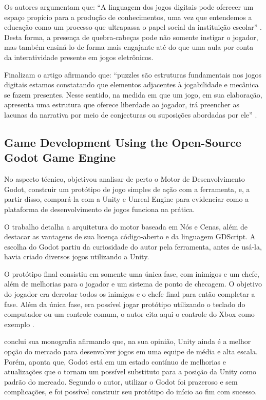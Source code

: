 Os autores argumentam que: ``A linguagem dos jogos digitais pode oferecer um espaço propício para a produção de conhecimentos, uma vez que entendemos a educação como um processo que ultrapassa o papel social da instituição escolar'' \cite[p. 105]{Toneis2015}. Desta forma, a presença de quebra-cabeças pode não somente instigar o jogador, mas também ensiná-lo de forma mais engajante até do que uma aula por conta da interatividade presente em jogos eletrônicos.

Finalizam o artigo afirmando que: ``puzzles são estruturas fundamentais nos jogos digitais estamos constatando que elementos adjacentes à jogabilidade e mecânica se fazem presentes. Nesse sentido, na medida em que um jogo, em sua elaboração, apresenta uma estrutura que oferece liberdade ao jogador, irá preencher as lacunas da narrativa por meio de conjecturas ou suposições abordadas por ele'' \cite[p. 111]{Toneis2015}.

\subsection{Game Development Using the Open-Source Godot Game Engine}

No aspecto técnico,  objetivou analisar de perto o Motor de Desenvolvimento Godot, construir um protótipo de jogo simples de ação com a ferramenta, e, a partir disso, compará-la com a Unity e Unreal Engine para evidenciar como a plataforma de desenvolvimento de jogos funciona na prática. 

O trabalho detalha a arquitetura do motor baseada em Nós e Cenas, além de destacar as vantagens de sua licença código-aberto e da linguagem GDScript. A escolha do Godot partiu da curiosidade do autor pela ferramenta, antes de usá-la,  havia criado diversos jogos utilizando a Unity.

O protótipo final consistiu em somente uma única fase, com inimigos e um chefe, além de melhorias para o jogador e um sistema de ponto de checagem. O objetivo do jogador era derrotar todos os inimigos e o chefe final para então completar a fase. Além da única fase, era possível jogar protótipo utilizando o teclado do computador ou um controle comum, o autor cita aqui o controle do Xbox como exemplo \cite{Salmela2022}.

 conclui sua monografia afirmando que, na sua opinião, Unity ainda é a melhor opção do mercado para desenvolver jogos em uma equipe de média e alta escala. Porém, aponta que, Godot está em um estado contínuo de melhorias e atualizações que o tornam um possível substituto para a posição da Unity como padrão do mercado. Segundo o autor, utilizar o Godot foi prazeroso e sem complicações, e foi possível construir seu protótipo do início ao fim com sucesso.

